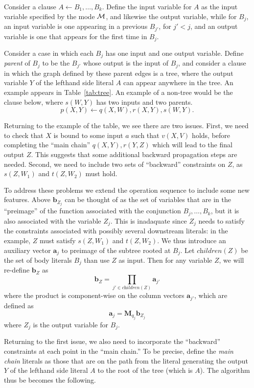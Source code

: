 \documentclass[12pt]{article}
\newcommand{\trm}[1]{\textit{#1}}
\newcommand{\vek}[1]{\textbf{#1}}
\newcommand{\M}{\textbf{M}}
\newcommand{\children}{\textit{children}}
\begin{document}
Consider a clause $A\leftarrow B_1,\ldots,B_k$.  Define the input
variable for $A$ as the input variable specified by the mode ${\cal
  M}$, and likewise the output variable, while for $B_j$, an input
variable is one appearing in a previous $B_{j'}$, for $j'<j$, and an
output variable is one that appears for the first time in $B_{j}$.

Consider a case in which each $B_j$ has one input and one output
variable.  Define \trm{parent} of $B_j$ to be the $B_{j'}$ whose
output is the input of $B_j$, and consider a clause in which the graph
defined by these parent edges is a tree, where the output variable $Y$
of the lefthand side literal $A$ can appear anywhere in the tree.  An
example appears in Table~\ref{tab:tree}. An example of a non-tree
would be the clause below, where $s(W,Y)$ has two inputs and two
parents.
\[ p(X,Y) \leftarrow q(X,W),r(X,Y),s(W,Y).
\] 

Returning to the example of the table, we see there are two issues.
First, we need to check that $X$ is bound to some input $a$ such that
$v(X,V)$ holds, before completing the ``main chain'' $q(X,Y),r(Y,Z)$
which will lead to the final output $Z$.  This suggests that some
additional backward propagation steps are needed.  Second, we need to
include two sets of ``backward'' constraints on $Z$, as $s(Z,W_1)$ and
$t(Z,W_2)$ must hold.

To address these problems we extend the operation sequence to include
some new features.  Above $\vek{b}_{Z_{j}}$ can be thought of as the
set of variables that are in the ``preimage'' of the function
associated with the conjunction $B_j,\ldots,B_k$, but it is also
associated with the variable $Z_j$.  This is inadaquate since $Z_j$
needs to satisfy the constraints associated with possibly several
downstream literals: in the example, $Z$ must satisfy $s(Z,W_1)$ and
$t(Z,W_2)$.  We thus introduce an auxiliary vector $\vek{a}_j$ to
preimage of the subtree rooted at $B_j$. Let $\children(Z)$ be the set
of body literals $B_j$ than use $Z$ as input. Then for any variable
$Z$, we will re-define $\vek{b}_Z$ as
\[ \vek{b}_Z = \prod_{j' \in \children(Z)} \vek{a}_{j'}
\]
where the product is component-wise on the column vectors $\vek{a}_{j'}$,
which are defined as 
\[ \vek{a}_{j} = \M_{q_j} \vek{b}_{Z_j}
\] 
where $Z_j$ is the output variable for $B_j$.

Returning to the first issue, we also need to incorporate the
``backward'' constraints at each point in the ``main chain.''  To be
precise, define the \trm{main chain} literals as those that are on the
path from the literal generating the output $Y$ of the lefthand side
literal $A$ to the root of the tree (which is $A$).  The algorithm
thus be becomes the following.
\end{document}
